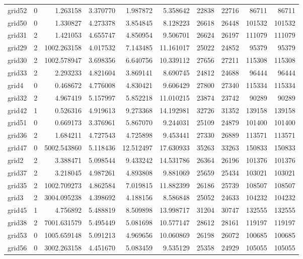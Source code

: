 \begin{longtable}{|l|r|r|r|r|r|r|r|r|r|}
grid52 & 0 & 1.263158 & 3.370770 & 1.987872 & 5.358642 & 22838 & 22716 & 86711 & 86711 \\
grid50 & 0 & 1.330827 & 4.273378 & 3.854845 & 8.128223 & 26618 & 26448 & 101532 & 101532 \\
grid31 & 2 & 1.421053 & 4.655747 & 4.850954 & 9.506701 & 26624 & 26197 & 111079 & 111079 \\
grid29 & 2 & 1002.263158 & 4.017532 & 7.143485 & 11.161017 & 25022 & 24852 & 95379 & 95379 \\
grid30 & 2 & 1002.578947 & 3.698356 & 6.640756 & 10.339112 & 27656 & 27211 & 115308 & 115308 \\
grid33 & 2 & 2.293233 & 4.821604 & 3.869141 & 8.690745 & 24812 & 24688 & 96444 & 96444 \\
grid4 & 0 & 0.468672 & 4.776008 & 4.830421 & 9.606429 & 27800 & 27340 & 115334 & 115334 \\
grid32 & 2 & 4.967419 & 5.157997 & 5.852218 & 11.010215 & 23874 & 23742 & 90289 & 90289 \\
grid42 & 1 & 0.526316 & 4.919613 & 9.273368 & 14.192981 & 32726 & 31352 & 139158 & 139158 \\
grid51 & 0 & 0.669173 & 3.376961 & 5.867070 & 9.244031 & 25109 & 24879 & 101400 & 101400 \\
grid36 & 2 & 1.684211 & 4.727543 & 4.725898 & 9.453441 & 27330 & 26889 & 113571 & 113571 \\
grid47 & 0 & 5002.543860 & 5.118436 & 12.512497 & 17.630933 & 35263 & 33263 & 150833 & 150833 \\
grid2 & 2 & 3.388471 & 5.098544 & 9.433242 & 14.531786 & 26364 & 26196 & 101376 & 101376 \\
grid37 & 2 & 3.218045 & 4.987261 & 4.893808 & 9.881069 & 25659 & 25434 & 103021 & 103021 \\
grid35 & 2 & 1002.709273 & 4.862584 & 7.019815 & 11.882399 & 26186 & 25739 & 108507 & 108507 \\
grid3 & 2 & 3004.095238 & 4.398692 & 4.188156 & 8.586848 & 25052 & 24633 & 104232 & 104232 \\
grid45 & 1 & 4.756892 & 5.488819 & 8.509898 & 13.998717 & 31204 & 30747 & 132555 & 132555 \\
grid38 & 2 & 7001.631579 & 5.495449 & 5.081698 & 10.577147 & 28612 & 28161 & 119197 & 119197 \\
grid53 & 0 & 1005.659148 & 5.091213 & 4.969656 & 10.060869 & 26198 & 26072 & 100685 & 100685 \\
grid56 & 0 & 3002.263158 & 4.451670 & 5.083459 & 9.535129 & 25358 & 24929 & 105055 & 105055 \\

\end{longtable}

